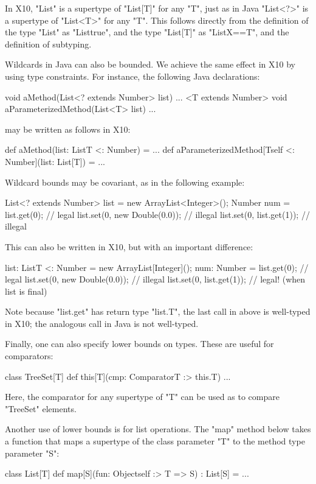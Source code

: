 \documentclass[preprint,nocopyrightspace,9pt]{sigplanconf}
\begin{document}
In X10, \xcd"List"
is a supertype of
\xcd"List[T]" for any \xcd"T",
just as in Java
\xcd"List<?>" is a supertype of
\xcd"List<T>" for any \xcd"T".
This follows directly from the definition of the type \xcd"List"
as \xcd"List{true}", and the type \xcd"List[T]"
as \xcd"List{X==T}", and the definition of subtyping.

Wildcards in Java can also be bounded.
We achieve the same
effect in X10 by using type constraints.
For instance, the following Java declarations:
\begin{xten}
void aMethod(List<? extends Number> list) { ... }
<T extends Number> void aParameterizedMethod(List<T> list) { ... }
\end{xten}
may be written as follows in X10:
\begin{xten}
def aMethod(list: List{T <: Number}) = { ... }
def aParameterizedMethod[T{self <: Number}](list: List[T]) = { ... }
\end{xten}

Wildcard bounds may be covariant, as in the following example:
\begin{xten}
List<? extends Number> list = new ArrayList<Integer>();
Number num = list.get(0);     // legal
list.set(0, new Double(0.0)); // illegal
list.set(0, list.get(1));     // illegal
\end{xten}
This can also be written in X10, but with an important
difference:
\begin{xten}
list: List{T <: Number} = new ArrayList[Integer]();
num: Number = list.get(0);    // legal
list.set(0, new Double(0.0)); // illegal
list.set(0, list.get(1));     // legal! (when list is final)
\end{xten}
Note because \xcd"list.get" has return type \xcd"list.T", the
last call in above is well-typed in X10; the analogous call in
Java is not well-typed.

Finally,
one can also specify lower bounds on types.  These are useful for
comparators:
\begin{xten}
class TreeSet[T] {
    def this[T](cmp: Comparator{T :> this.T}) { ... }
}
\end{xten}
Here, the comparator for any supertype of \xcd"T" can be used as
to compare \xcd"TreeSet" elements.

Another use of lower bounds is for list operations.
The \xcd"map" method below takes a function that maps a supertype
of the class parameter \xcd"T" to the method type parameter \xcd"S":
\begin{xten}
class List[T] {
    def map[S](fun: Object{self :> T} => S) : List[S] = { ... }
}
\end{xten}
\end{document}
